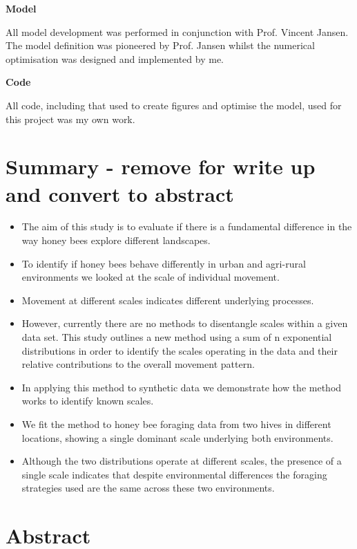 \documentclass[11pt,usenames,dvipsnames,a4paper]{article}
\begin{document}
\noindent
\Large{\textbf{Model}}

\noindent
All model development was performed in conjunction with Prof. Vincent Jansen. The model definition was pioneered by Prof. Jansen whilst the numerical optimisation was designed and implemented by me.

\noindent
\Large{\textbf{Code}}

\noindent
All code, including that used to create figures and optimise the model, used for this project was my own work.

\newpage
\tableofcontents
\newpage

\section{Summary - remove for write up and convert to abstract}

\begin{itemize}
	\item The aim of this study is to evaluate if there is a fundamental difference in the way honey bees explore different landscapes.
	\item To identify if honey bees behave differently in urban and agri-rural environments we looked at the scale of individual movement.
	\item Movement at different scales indicates different underlying processes.
	\item However, currently there are no methods to disentangle scales within a given data set. This study outlines a new method using a sum of n exponential distributions in order to identify the scales operating in the data and their relative contributions to the overall movement pattern.
	\item In applying this method to synthetic data we demonstrate how the method works to identify known scales.
	\item We fit the method to honey bee foraging data from two hives  in different locations, showing a single dominant scale underlying both environments.
	\item Although the two distributions operate at different scales, the presence of a single scale indicates that despite environmental differences the foraging strategies used are the same across these two environments.
	
\end{itemize}

\section{Abstract}
\end{document}
